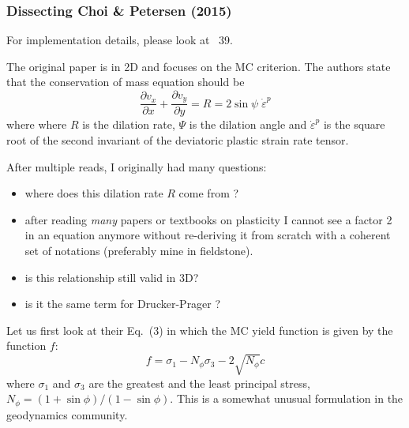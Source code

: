 \newpage
\subsubsection{Dissecting Choi \& Petersen (2015)}

For implementation details, please look at \stone~39. 

The original paper \cite{chpe15} is in 2D and focuses on the MC criterion. 
The authors state that the conservation of mass equation 
should be 
\[
\frac{\partial v_x}{\partial x}
+
\frac{\partial v_y}{\partial y}
=
R=2 \sin \psi \; \dot{\varepsilon}^p
\]
where where $R$ is the dilation rate, $\Psi$ is the dilation angle and
$\dot{\varepsilon}^p$ is the square root of the second invariant of the deviatoric plastic strain rate tensor.

After multiple reads, I originally had many questions:
\begin{itemize}
\item where does this dilation rate $R$ come from ? 
\item after reading \textit{many} papers or textbooks on plasticity 
I cannot see a factor 2 in an equation anymore without re-deriving 
it from scratch with a coherent set of notations (preferably mine in fieldstone). 
\item is this relationship still valid in 3D?
\item is it the same term for Drucker-Prager ?
\end{itemize}

\vspace{1cm}

Let us first look at their Eq.~(3)  in which  
the MC yield function is given by the function $f$:
\[
f = \sigma_1 - N_\phi \sigma_3 - 2 \sqrt{N_\phi} c 
\]
where $\sigma_1$ and $\sigma_3$ are the greatest and the least principal stress, $N_\phi=(1+\sin \phi)/(1-\sin \phi)$.
This is a somewhat unusual formulation in the geodynamics community.

